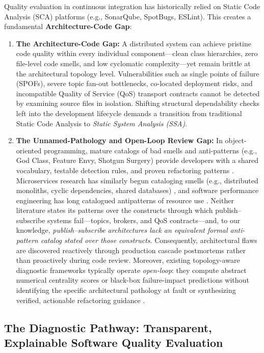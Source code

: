 Quality evaluation in continuous integration has historically relied on Static Code Analysis (SCA) platforms (e.g., SonarQube, SpotBugs, ESLint). This creates a fundamental \textbf{Architecture-Code Gap}:
\begin{enumerate}
    \item \textbf{The Architecture-Code Gap:} A distributed system can achieve pristine code quality within every individual component---clean class hierarchies, zero file-level code smells, and low cyclomatic complexity---yet remain brittle at the architectural topology level. Vulnerabilities such as single points of failure (SPOFs), severe topic fan-out bottlenecks, co-located deployment risks, and incompatible Quality of Service (QoS) transport contracts cannot be detected by examining source files in isolation. Shifting structural dependability checks left into the development lifecycle demands a transition from traditional Static Code Analysis to \emph{Static System Analysis (SSA)}.
    \item \textbf{The Unnamed-Pathology and Open-Loop Review Gap:} In object-oriented programming, mature catalogs of bad smells and anti-patterns (e.g., God Class, Feature Envy, Shotgun Surgery) provide developers with a shared vocabulary, testable detection rules, and proven refactoring patterns \citep{fowler1999refactoring, brown1998antipatterns, suryanarayana2014refactoring}. Microservices research has similarly begun cataloging smells (e.g., distributed monoliths, cyclic dependencies, shared databases) \citep{taibi2020microservices}, and software performance engineering has long catalogued antipatterns of resource use \citep{smith2000software, trubiani2023automated}. Neither literature states its patterns over the constructs through which publish--subscribe systems fail---topics, brokers, and QoS contracts---and, to our knowledge, \emph{publish--subscribe architectures lack an equivalent formal anti-pattern catalog stated over those constructs}. Consequently, architectural flaws are discovered reactively through production cascade postmortems rather than proactively during code review. Moreover, existing topology-aware diagnostic frameworks typically operate \emph{open-loop}: they compute abstract numerical centrality scores or black-box failure-impact predictions without identifying the specific architectural pathology at fault or synthesizing verified, actionable refactoring guidance \citep{harman2012sbse, aleti2013software}.
\end{enumerate}

\subsection{The Diagnostic Pathway: Transparent, Explainable Software Quality Evaluation}
\label{sec:intro:solution}


